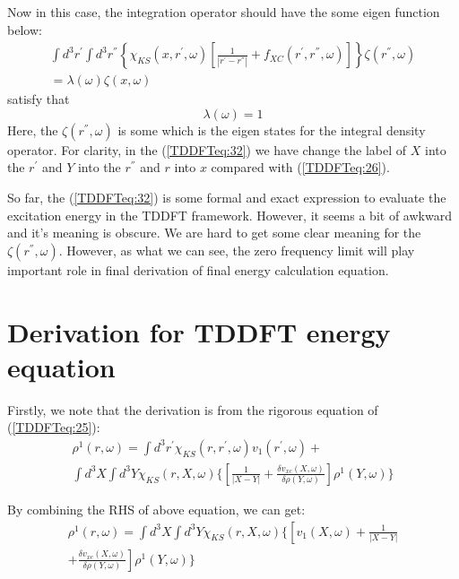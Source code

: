 Now in this case, the integration operator should have the some eigen
function below:
\begin{multline}\label{TDDFTeq:32}
\int d^{3}r^{'} \int
d^{3}r^{''}\left\{\chi_{KS}(x,r^{'},\omega)
\left[\frac{1}{|r^{'}-r^{''}|}  +
f_{XC}(r^{'},r^{''},\omega)\right]\right\} \zeta(r^{''}, 
\omega) \\
= \lambda(\omega)\zeta(x, \omega)
\end{multline}
satisfy that
\begin{equation}\label{}
\lambda(\omega) = 1
\end{equation}
Here, the $\zeta(r^{''}, \omega)$ is some which is the eigen states
for the integral density operator. For clarity, in the
(\ref{TDDFTeq:32}) we have change the label of $X$ into the $r^{'}$
and $Y$ into the $r^{''}$ and $r$ into $x$ compared with
(\ref{TDDFTeq:26}).

So far, the (\ref{TDDFTeq:32}) is some formal and exact expression
to evaluate the excitation energy in the TDDFT framework. However, it
seems a bit of awkward and it's meaning is obscure. We are hard to
get some clear meaning for the $\zeta(r^{''}, \omega)$.  However, as
what we can see, the zero frequency limit will play important role in
final derivation of final energy calculation equation. 


\section{Derivation for TDDFT energy equation}
%
%
%
%
Firstly, we note that the derivation is from the rigorous equation of
(\ref{TDDFTeq:25}):
\begin{multline}\label{TDDFT_ENERGY_EQUATION_eq:1}
\rho^{1}(r,\omega) = \int d^{3}r^{'}\chi_{KS}(r, r^{'},
\omega)
v_{1}(r^{'},\omega) + \\
\int d^{3}X \int d^{3}Y\chi_{KS}(r, X, \omega)
\Bigg\{\left[\frac{1}{|X-Y|} + \frac{\delta v_{xc}(X,\omega)}{\delta
\rho(Y,\omega)}\right]\rho^{1}(Y,\omega) \Bigg\}
\end{multline}

By combining the RHS of above equation, we can get:
\begin{multline}\label{TDDFT_ENERGY_EQUATION_eq:5}
\rho^{1}(r,\omega) = 
\int d^{3}X \int d^{3}Y\chi_{KS}(r, X, \omega)
\Bigg\{\left[ v_{1}(X,\omega) + \frac{1}{|X-Y|} \right. \\
\left. + \frac{\delta
v_{xc}(X,\omega)}{\delta
\rho(Y,\omega)}\right] \rho^{1}(Y,\omega) \Bigg\}
\end{multline}

